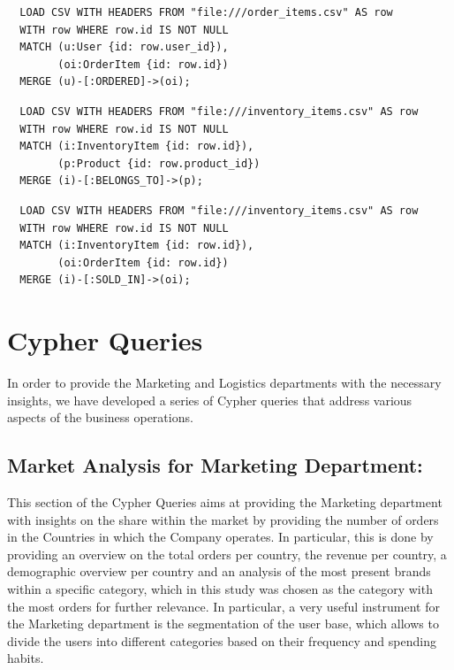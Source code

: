 \documentclass[a4paper,12pt]{article}
\begin{document}
\begin{verbatim}
  LOAD CSV WITH HEADERS FROM "file:///order_items.csv" AS row
  WITH row WHERE row.id IS NOT NULL
  MATCH (u:User {id: row.user_id}),
        (oi:OrderItem {id: row.id})
  MERGE (u)-[:ORDERED]->(oi);
\end{verbatim}


\begin{verbatim}
  LOAD CSV WITH HEADERS FROM "file:///inventory_items.csv" AS row
  WITH row WHERE row.id IS NOT NULL
  MATCH (i:InventoryItem {id: row.id}),
        (p:Product {id: row.product_id})
  MERGE (i)-[:BELONGS_TO]->(p);
\end{verbatim}

\begin{verbatim}
  LOAD CSV WITH HEADERS FROM "file:///inventory_items.csv" AS row
  WITH row WHERE row.id IS NOT NULL
  MATCH (i:InventoryItem {id: row.id}),
        (oi:OrderItem {id: row.id})
  MERGE (i)-[:SOLD_IN]->(oi);
\end{verbatim}

\newpage
\section{Cypher Queries}
In order to provide the Marketing and Logistics departments with the necessary insights, we have developed a series of Cypher queries that address various aspects of the business operations.

\subsection{Market Analysis for Marketing Department:}
This section of the Cypher Queries aims at providing the Marketing department with insights on the share within the market by providing the number of orders in the Countries in which the Company operates.
In particular, this is done by providing an overview on the total orders per country, the revenue per country, a demographic overview per country and an analysis of the most present brands within a specific 
category, which in this study was chosen as the category with the most orders for further relevance.
In particular, a very useful instrument for the Marketing department is the segmentation of the user base, which allows to divide the users into different categories based on their frequency and spending habits.
\end{document}
